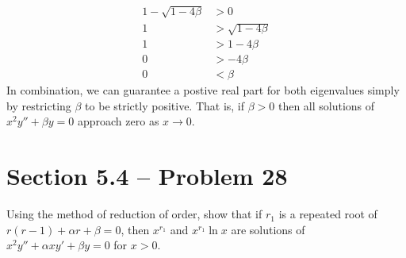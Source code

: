 \documentclass{article}
\theoremstyle{definition}
\begin{document}
        \begin{align*}
            1 - \sqrt{1 - 4\beta} &> 0 \\
            1 &> \sqrt{1- 4\beta} \\
            1 &> 1 - 4\beta \\
            0 &> -4\beta \\
            0 &< \beta
        \end{align*}
        In combination, we can guarantee a postive real part for both eigenvalues simply by restricting $\beta$ to be strictly positive.
        That is, if $\beta > 0$ then all solutions of $x^2 y'' + \beta y = 0$ approach zero as $x \rightarrow 0$. 
        \pagebreak
\section*{Section 5.4 -- Problem 28}
    Using the method of reduction of order, show that if $r_1$ is a repeated root of $r(r - 1) + \alpha r + \beta = 0$,
then $x^{r_1}$ and $x^{r_1} \ln x$ are solutions of $x^2 y'' + \alpha x y' + \beta y = 0$ for $x > 0$.
    \\ \hline
\end{document}

